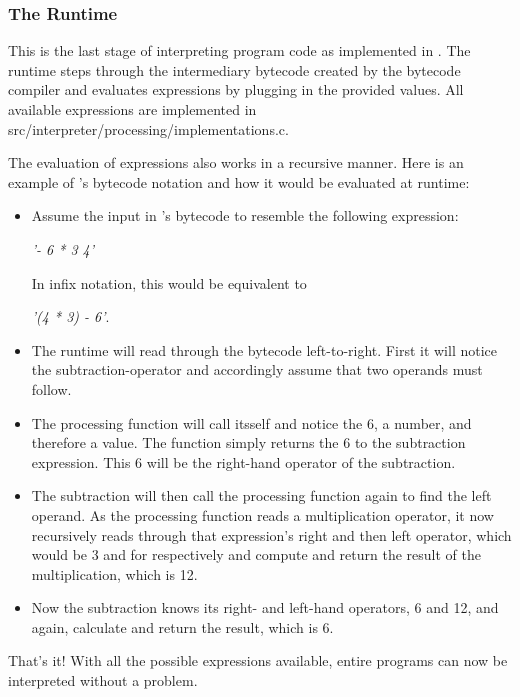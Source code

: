 \documentclass[12pt,a4paper,man]{apa7}
\begin{document}
\subsubsection{The Runtime}
This is the last stage of interpreting program code as implemented in \name.
The runtime steps through the intermediary bytecode created by the bytecode
compiler and evaluates expressions by plugging in the provided values.
All available expressions are implemented in 
src/interpreter/processing/implementations.c.

The evaluation of expressions also works in a recursive manner. Here is an 
example of \name's bytecode notation and how it would be evaluated at runtime:
\begin{itemize}
    \item Assume the input in \name's bytecode to resemble the following expression: 
        \begin{center}
            \emph{'- 6 * 3 4'}
        \end{center}
        In infix notation, this would be equivalent to 
        \begin{center}
            \emph{'(4 * 3) - 6'}.
        \end{center}
    \item The runtime will read through the bytecode left-to-right. First it will
        notice the subtraction-operator and accordingly assume that two
        operands must follow.
    \item The processing function will call itsself
        and notice the 6, a number, and therefore a value. The function simply returns the 6
        to the subtraction expression. This 6 will be the right-hand operator
        of the subtraction.
    \item The subtraction will then call the processing function again to find
        the left operand. As the processing function reads a multiplication operator,
        it now recursively reads through that expression's right and then left
        operator, which would be 3 and for respectively and compute and return
        the result of the multiplication, which is 12.
    \item Now the subtraction knows its right- and left-hand operators, 6 and 12,
        and again, calculate and return the result, which is 6.
\end{itemize}

That's it! With all the possible expressions available, entire programs
can now be interpreted without a problem.
\end{document}
